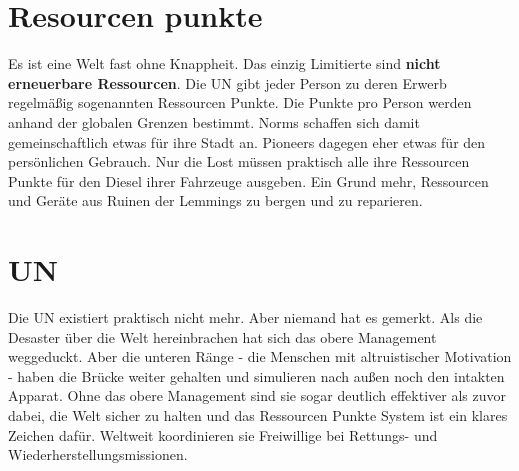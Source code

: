 \section{Resourcen punkte}
\label{sec:Resource Points}

Es ist eine Welt fast ohne Knappheit. Das einzig Limitierte sind \textbf{nicht erneuerbare Ressourcen}. Die UN gibt jeder Person zu deren Erwerb regelmäßig sogenannten Ressourcen Punkte. Die Punkte pro Person werden anhand der globalen Grenzen bestimmt. Norms schaffen sich damit gemeinschaftlich etwas für ihre Stadt an. Pioneers dagegen eher etwas für den persönlichen Gebrauch. Nur die Lost müssen praktisch alle ihre Ressourcen Punkte für den Diesel ihrer Fahrzeuge ausgeben. Ein Grund mehr, Ressourcen und Geräte aus Ruinen der Lemmings zu bergen und zu reparieren.

\section{UN}
\label{sec:UN}

Die UN existiert praktisch nicht mehr. Aber niemand hat es gemerkt. Als die Desaster über die Welt hereinbrachen hat sich das obere Management weggeduckt. Aber die unteren Ränge - die Menschen mit altruistischer Motivation - haben die Brücke weiter gehalten und simulieren nach außen noch den intakten Apparat. Ohne das obere Management sind sie sogar deutlich effektiver als zuvor dabei, die Welt sicher zu halten und das Ressourcen Punkte System ist ein klares Zeichen dafür. Weltweit koordinieren sie Freiwillige bei Rettungs- und Wiederherstellungsmissionen.
